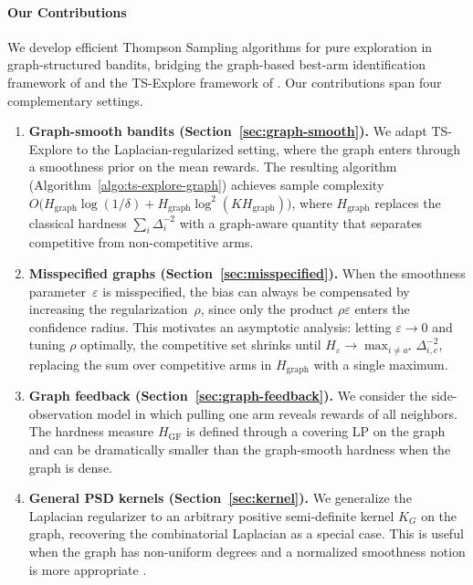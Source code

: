 \documentclass{article}
\begin{document}
\paragraph{Our Contributions}\label{sec:contributions}

We develop efficient Thompson Sampling algorithms for pure exploration in graph-structured bandits, bridging the graph-based best-arm identification framework of \cite{thaker2022maximizing} and the TS-Explore framework of \cite{wang2022thompson}. Our contributions span four complementary settings.

\begin{enumerate}[leftmargin=*]
\item \textbf{Graph-smooth bandits (Section~\ref{sec:graph-smooth}).}
We adapt TS-Explore to the Laplacian-regularized setting, where the graph enters through a smoothness prior on the mean rewards. The resulting algorithm (Algorithm~\ref{algo:ts-explore-graph}) achieves sample complexity $O\bigl(H_{\mathrm{graph}}\log(1/\delta) + H_{\mathrm{graph}}\log^2(KH_{\mathrm{graph}})\bigr)$, where $H_{\mathrm{graph}}$ replaces the classical hardness $\sum_i \Delta_i^{-2}$ with a graph-aware quantity that separates competitive from non-competitive arms.

\item \textbf{Misspecified graphs (Section~\ref{sec:misspecified}).}
When the smoothness parameter~$\varepsilon$ is misspecified, the bias can always be compensated by increasing the regularization~$\rho$, since only the product $\rho\varepsilon$ enters the confidence radius. This motivates an asymptotic analysis: letting $\varepsilon\to 0$ and tuning $\rho$ optimally, the competitive set shrinks until $H_\varepsilon\to\max_{i\neq a^\star}\Delta_{i,c}^{-2}$, replacing the sum over competitive arms in $H_{\mathrm{graph}}$ with a single maximum.

\item \textbf{Graph feedback (Section~\ref{sec:graph-feedback}).}
We consider the side-observation model in which pulling one arm reveals rewards of all neighbors. The hardness measure $H_{\mathrm{GF}}$ is defined through a covering LP on the graph and can be dramatically smaller than the graph-smooth hardness when the graph is dense.

\item \textbf{General PSD kernels (Section~\ref{sec:kernel}).}
We generalize the Laplacian regularizer to an arbitrary positive semi-definite kernel $K_G$ on the graph, recovering the combinatorial Laplacian as a special case. This is useful when the graph has non-uniform degrees and a normalized smoothness notion is more appropriate \citep{chung1997spectral}.


\end{enumerate}
\end{document}
